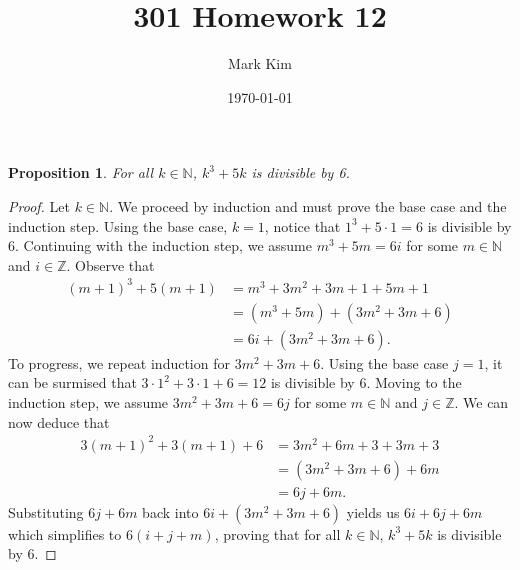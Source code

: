 \documentclass[12pt]{amsart}
\title{301 Homework 12}
\author{Mark Kim}
\date{\today}
\newcommand{\Z}{\mathbb{Z}}
\newcommand{\N}{\mathbb{N}}
\newtheorem*{proposition}{Proposition}
\begin{document}
\maketitle

\begin{proposition}
For all $k\in\N$, $k^3+5k$ is divisible by 6.
\end{proposition}

\begin{proof}
Let $k\in\N$. We proceed by induction and must prove the base case and the induction step.  Using the base case, $k=1$, notice that $1^3+5\cdot1=6$ is divisible by $6$.  Continuing with the induction step, we assume $m^3+5m=6i$ for some $m\in\N$ and $i\in\Z$.  Observe that
\begin{align*}
(m+1)^3 + 5(m+1) &= m^3 + 3m^2 + 3m + 1 + 5m + 1\\
&= (m^3 + 5m) + (3m^2 + 3m +6)\\
&= 6i + (3m^2 + 3m + 6).
\end{align*}
To progress, we repeat induction for $3m^2 + 3m + 6$.  Using the base case $j=1$, it can be surmised that $3\cdot1^2 + 3\cdot1 + 6 = 12$ is divisible by $6$.  Moving to the induction step, we assume $3m^2 + 3m + 6 = 6j$ for some $m\in\N$ and $j\in\Z$.  We can now deduce that
\begin{align*}
3(m+1)^2 + 3(m+1) + 6 &= 3m^2+6m+3+3m+3\\
&= (3m^2 + 3m +6) + 6m\\
&= 6j + 6m.
\end{align*}
Substituting $6j + 6m$ back into $6i + (3m^2 + 3m + 6)$ yields us $6i + 6j + 6m$ which simplifies to $6(i+j+m)$, proving that for all $k\in\N$, $k^3+5k$ is divisible by 6.
\end{proof}
\end{document}
